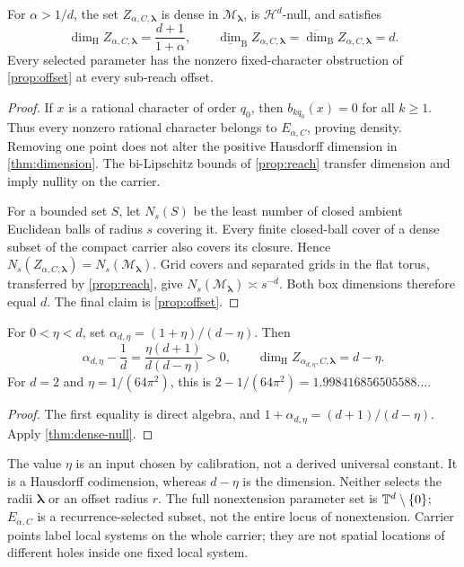 \documentclass[11pt,a4paper]{article}
\begin{document}
\begin{theorem}\label{thm:dense-null}
For $\alpha>1/d$, the set $Z_{\alpha,C,\boldsymbol\lambda}$ is dense in
$\mathcal M_{\boldsymbol\lambda}$, is $\mathcal H^d$-null, and satisfies
\[
 \dim_{\mathrm H}Z_{\alpha,C,\boldsymbol\lambda}
          =\frac{d+1}{1+\alpha},\qquad
 \underline{\dim}_{\mathrm B}Z_{\alpha,C,\boldsymbol\lambda}
 =\overline{\dim}_{\mathrm B}Z_{\alpha,C,\boldsymbol\lambda}=d.
\]
Every selected parameter has the nonzero fixed-character obstruction of
\cref{prop:offset} at every sub-reach offset.
\end{theorem}

\begin{proof}
If $x$ is a rational character of order $q_0$, then
$b_{kq_0}(x)=0$ for all $k\geq1$.  Thus every nonzero rational character
belongs to $E_{\alpha,C}$, proving density.  Removing one point does not
alter the positive Hausdorff dimension in \cref{thm:dimension}.
The bi-Lipschitz bounds of \cref{prop:reach} transfer dimension and imply
nullity on the carrier.

For a bounded set $S$, let $N_s(S)$ be the least number of closed ambient
Euclidean balls of radius $s$ covering it.  Every finite closed-ball cover
of a dense subset of the compact carrier also covers its closure.  Hence
$N_s(Z_{\alpha,C,\boldsymbol\lambda})=N_s(\mathcal M_{\boldsymbol\lambda})$.
Grid covers and separated grids in the flat torus, transferred by
\cref{prop:reach}, give $N_s(\mathcal M_{\boldsymbol\lambda})\asymp s^{-d}$.
Both box dimensions therefore equal $d$.  The final claim is
\cref{prop:offset}.
\end{proof}

\begin{corollary}
\label{cor:calibration}
For $0<\eta<d$, set $\alpha_{d,\eta}=(1+\eta)/(d-\eta)$.  Then
\[
 \alpha_{d,\eta}-\frac1d=\frac{\eta(d+1)}{d(d-\eta)}>0,\qquad
 \dim_{\mathrm H}Z_{\alpha_{d,\eta},C,\boldsymbol\lambda}=d-\eta.
\]
For $d=2$ and $\eta=1/(64\pi^2)$, this is
$2-1/(64\pi^2)=1.998416856505588\ldots$.
\end{corollary}

\begin{proof}
The first equality is direct algebra, and
$1+\alpha_{d,\eta}=(d+1)/(d-\eta)$.  Apply \cref{thm:dense-null}.
\end{proof}

The value $\eta$ is an input chosen by calibration, not a derived
universal constant.  It is a Hausdorff codimension, whereas $d-\eta$ is
the dimension.  Neither selects the radii $\boldsymbol\lambda$ or an
offset radius $r$.  The full nonextension parameter set is
$\mathbb T^d\setminus\{0\}$; $E_{\alpha,C}$ is a recurrence-selected subset,
not the entire locus of nonextension.  Carrier points label local systems
on the whole carrier; they are not spatial locations of different holes
inside one fixed local system.
\end{document}

